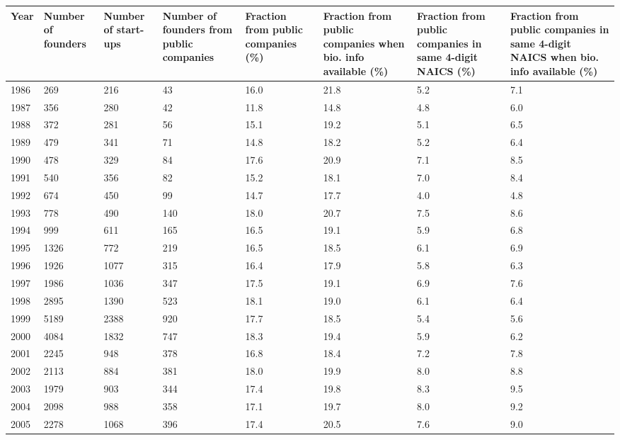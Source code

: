 \begin{table}[!htb]
\centering
\begingroup\scriptsize
\begin{tabular}{p{1.75cm}p{1.75cm}p{1.75cm}p{1.75cm}p{1.75cm}p{1.75cm}p{1.75cm}p{1.75cm}}
  \toprule
Year & Number of founders & Number of start-ups & Number of founders from public companies & Fraction from public companies (\%) & Fraction from public companies when bio. info available (\%) & Fraction from public companies in same 4-digit NAICS (\%) & Fraction from public companies in same 4-digit NAICS when bio. info available (\%) \\ 
  \midrule
1986 & 269 & 216 & 43 & 16.0 & 21.8 & 5.2 & 7.1 \\ 
  1987 & 356 & 280 & 42 & 11.8 & 14.8 & 4.8 & 6.0 \\ 
  1988 & 372 & 281 & 56 & 15.1 & 19.2 & 5.1 & 6.5 \\ 
  1989 & 479 & 341 & 71 & 14.8 & 18.2 & 5.2 & 6.4 \\ 
  1990 & 478 & 329 & 84 & 17.6 & 20.9 & 7.1 & 8.5 \\ 
  1991 & 540 & 356 & 82 & 15.2 & 18.1 & 7.0 & 8.4 \\ 
  1992 & 674 & 450 & 99 & 14.7 & 17.7 & 4.0 & 4.8 \\ 
  1993 & 778 & 490 & 140 & 18.0 & 20.7 & 7.5 & 8.6 \\ 
  1994 & 999 & 611 & 165 & 16.5 & 19.1 & 5.9 & 6.8 \\ 
  1995 & 1326 & 772 & 219 & 16.5 & 18.5 & 6.1 & 6.9 \\ 
  1996 & 1926 & 1077 & 315 & 16.4 & 17.9 & 5.8 & 6.3 \\ 
  1997 & 1986 & 1036 & 347 & 17.5 & 19.1 & 6.9 & 7.6 \\ 
  1998 & 2895 & 1390 & 523 & 18.1 & 19.0 & 6.1 & 6.4 \\ 
  1999 & 5189 & 2388 & 920 & 17.7 & 18.5 & 5.4 & 5.6 \\ 
  2000 & 4084 & 1832 & 747 & 18.3 & 19.4 & 5.9 & 6.2 \\ 
  2001 & 2245 & 948 & 378 & 16.8 & 18.4 & 7.2 & 7.8 \\ 
  2002 & 2113 & 884 & 381 & 18.0 & 19.9 & 8.0 & 8.8 \\ 
  2003 & 1979 & 903 & 344 & 17.4 & 19.8 & 8.3 & 9.5 \\ 
  2004 & 2098 & 988 & 358 & 17.1 & 19.7 & 8.0 & 9.2 \\ 
  2005 & 2278 & 1068 & 396 & 17.4 & 20.5 & 7.6 & 9.0 \\ 

\end{tabular}
\end{table}
